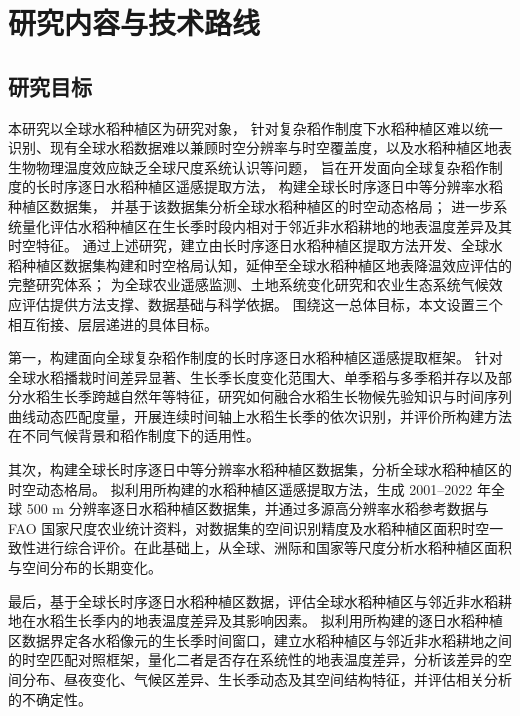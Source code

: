 
\section{研究内容与技术路线}

\subsection{研究目标}
本研究以全球水稻种植区为研究对象，
针对复杂稻作制度下水稻种植区难以统一识别、现有全球水稻数据难以兼顾时空分辨率与时空覆盖度，以及水稻种植区地表生物物理温度效应缺乏全球尺度系统认识等问题，
旨在开发面向全球复杂稻作制度的长时序逐日水稻种植区遥感提取方法，
构建全球长时序逐日中等分辨率水稻种植区数据集，%
并基于该数据集分析全球水稻种植区的时空动态格局；
进一步系统量化评估水稻种植区在生长季时段内相对于邻近非水稻耕地的地表温度差异及其时空特征。
通过上述研究，建立由长时序逐日水稻种植区提取方法开发、全球水稻种植区数据集构建和时空格局认知，延伸至全球水稻种植区地表降温效应评估的完整研究体系；
为全球农业遥感监测、土地系统变化研究和农业生态系统气候效应评估提供方法支撑、数据基础与科学依据。
围绕这一总体目标，本文设置三个相互衔接、层层递进的具体目标。

第一，构建面向全球复杂稻作制度的长时序逐日水稻种植区遥感提取框架。
针对全球水稻播栽时间差异显著、生长季长度变化范围大、单季稻与多季稻并存以及部分水稻生长季跨越自然年等特征，研究如何融合水稻生长物候先验知识与时间序列曲线动态匹配度量，开展连续时间轴上水稻生长季的依次识别，并评价所构建方法在不同气候背景和稻作制度下的适用性。

其次，构建全球长时序逐日中等分辨率水稻种植区数据集，分析全球水稻种植区的时空动态格局。
拟利用所构建的水稻种植区遥感提取方法，生成 2001--2022 年全球 500 m 分辨率逐日水稻种植区数据集，并通过多源高分辨率水稻参考数据与 FAO 国家尺度农业统计资料，对数据集的空间识别精度及水稻种植区面积时空一致性进行综合评价。在此基础上，从全球、洲际和国家等尺度分析水稻种植区面积与空间分布的长期变化。

最后，基于全球长时序逐日水稻种植区数据，评估全球水稻种植区与邻近非水稻耕地在水稻生长季内的地表温度差异及其影响因素。
拟利用所构建的逐日水稻种植区数据界定各水稻像元的生长季时间窗口，建立水稻种植区与邻近非水稻耕地之间的时空匹配对照框架，量化二者是否存在系统性的地表温度差异，分析该差异的空间分布、昼夜变化、气候区差异、生长季动态及其空间结构特征，并评估相关分析的不确定性。

